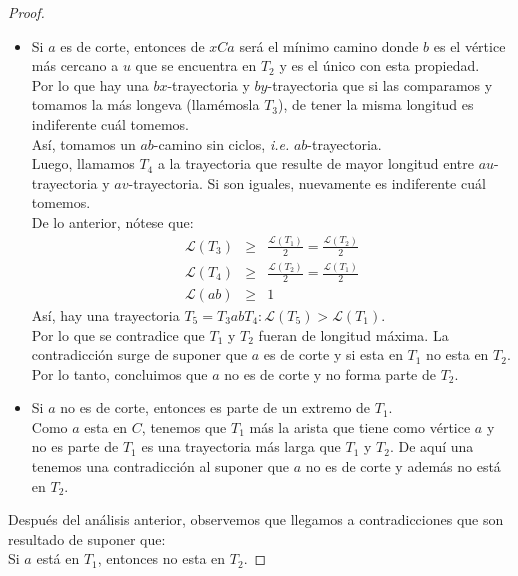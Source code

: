\documentclass{article}
\begin{document}
\begin{enumerate}
\begin{proof}
\begin{itemize}
          \begin{itemize}
            \item Si $a$ es de corte, entonces de $xCa$ será el mínimo camino donde $b$ es el
              vértice más cercano a $u$ que se encuentra en $T_{2}$ y es el único con esta propiedad. \\
              Por lo que hay una $bx$-trayectoria y $by$-trayectoria que si las comparamos y tomamos la más
              longeva (llamémosla $T_{3}$), de tener la misma longitud es indiferente cuál tomemos. \\
              Así, tomamos un $ab$-camino sin ciclos, \textit{i.e.} $ab$-trayectoria. \\
              Luego, llamamos $T_{4}$ a la trayectoria que resulte de mayor longitud entre $au$-trayectoria
              y $av$-trayectoria. Si son iguales, nuevamente es indiferente cuál tomemos. \\
              De lo anterior, nótese que:
              \begin{eqnarray*}
                \mathcal{L}(T_3) &\geq& \frac{\mathcal{L}(T_1)}{2} = \frac{\mathcal{L}(T_2)}{2}\\
                \mathcal{L}(T_4) &\geq& \frac{\mathcal{L}(T_2)}{2} = \frac{\mathcal{L}(T_1)}{2}\\
                \mathcal{L}(ab) &\geq& 1
              \end{eqnarray*}
              Así, hay una trayectoria $T_{5} = T_{3} ab T_{4}: \mathcal{L}(T_{5}) > \mathcal{L}(T_{1})$. \\
              Por lo que se contradice que $T_{1}$ y $T_{2}$ fueran de longitud máxima. La contradicción surge de
              suponer que $a$ es de corte y si esta en $T_{1}$ no esta en $T_{2}$. \\
              Por lo tanto, concluimos que $a$ no es de corte y no forma parte de $T_{2}$.

            \item Si $a$ no es de corte, entonces es parte de un extremo de $T_{1}$. \\
              Como $a$ esta en $C$, tenemos que $T_{1}$ más la arista que tiene como vértice $a$ y
              no es parte de $T_{1}$ es una trayectoria más larga que $T_{1}$ y $T_{2}$. De aquí una tenemos una
              contradicción al suponer que $a$ no es de corte y además no está en $T_{2}$.
          \end{itemize}
      \end{itemize}
      Después del análisis anterior, observemos que llegamos a contradicciones que son resultado
      de suponer que: \\
      Si $a$ está en $T_{1}$, entonces no esta en $T_{2}$.


\end{proof}
\end{enumerate}
\end{document}
